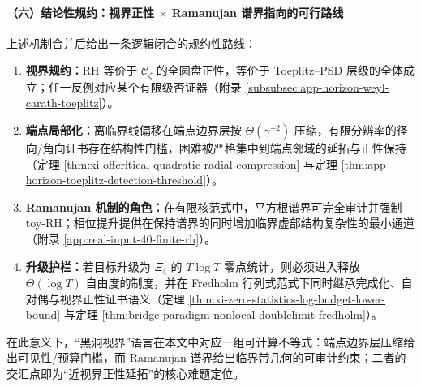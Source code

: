 \paragraph{（六）结论性规约：视界正性 \(\times\) Ramanujan 谱界指向的可行路线}
上述机制合并后给出一条逻辑闭合的规约性路线：
\begin{enumerate}
  \item \textbf{视界规约：}RH 等价于 \(\mathscr{C}_{\zeta}\) 的全圆盘正性，等价于 Toeplitz--PSD 层级的全体成立；任一反例对应某个有限级否证器（附录 \ref{subsubsec:app-horizon-weyl-carath-toeplitz}）。
  \item \textbf{端点局部化：}离临界线偏移在端点边界层按 \(\Theta(\gamma^{-2})\) 压缩，有限分辨率的径向/角向证书存在结构性门槛，困难被严格集中到端点邻域的延拓与正性保持（定理 \ref{thm:xi-offcritical-quadratic-radial-compression} 与定理 \ref{thm:app-horizon-toeplitz-detection-threshold}）。
  \item \textbf{Ramanujan 机制的角色：}在有限核范式中，平方根谱界可完全审计并强制 toy-RH；相位提升提供在保持谱界的同时增加临界虚部结构复杂性的最小通道（附录 \ref{app:real-input-40-finite-rh}）。
  \item \textbf{升级护栏：}若目标升级为 \(\Xi_{\zeta}\) 的 \(T\log T\) 零点统计，则必须进入释放 \(\Theta(\log T)\) 自由度的制度，并在 Fredholm 行列式范式下同时继承完成化、自对偶与视界正性证书语义（定理 \ref{thm:xi-zero-statistics-log-budget-lower-bound} 与定理 \ref{thm:bridge-paradigm-nonlocal-doublelimit-fredholm}）。
\end{enumerate}
在此意义下，“黑洞视界”语言在本文中对应一组可计算不等式：端点边界层压缩给出可见性/预算门槛，而 Ramanujan 谱界给出临界带几何的可审计约束；二者的交汇点即为“近视界正性延拓”的核心难题定位。

\endinput

